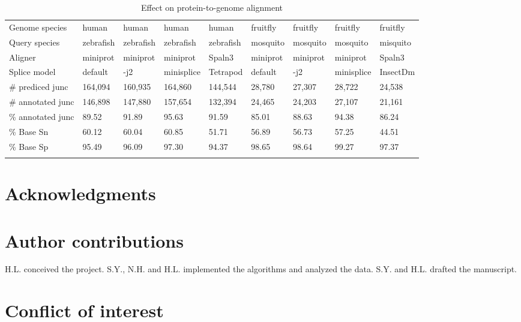 \documentclass[webpdf,contemporary,large,namedate]{oup-authoring-template}%
\begin{document}
\begin{table*}[!tb]
\caption{Effect on protein-to-genome alignment\label{tab:eval}}
\begin{tabular*}{\textwidth}{@{\extracolsep\fill}lllllllll@{\extracolsep\fill}}
\toprule
Genome species    & human     & human     & human      & human     & fruitfly & fruitfly & fruitfly   & fruitfly \\
Query species     & zebrafish & zebrafish & zebrafish  & zebrafish & mosquito & mosquito & mosquito   & misquito \\
Aligner           & miniprot  & miniprot  & miniprot   & Spaln3    & miniprot & miniprot & miniprot   & Spaln3 \\
Splice model      & default   & -j2       & minisplice & Tetrapod  & default  & -j2      & minisplice & InsectDm \\
\midrule
\# prediced junc  & 164,094   & 160,935   & 164,860    & 144,544   & 28,780   & 27,307   & 28,722     & 24,538 \\
\# annotated junc & 146,898   & 147,880   & 157,654    & 132,394   & 24,465   & 24,203   & 27,107     & 21,161 \\
\% annotated junc & 89.52     & 91.89     & 95.63      & 91.59     & 85.01    & 88.63    & 94.38      & 86.24 \\
\% Base Sn        & 60.12     & 60.04     & 60.85      & 51.71     & 56.89    & 56.73    & 57.25      & 44.51 \\
\% Base Sp        & 95.49     & 96.09     & 97.30      & 94.37     & 98.65    & 98.64    & 99.27      & 97.37 \\
\botrule
\end{tabular*}
\begin{tablenotes}\setlength\itemsep{0.0em}
\end{tablenotes}
\end{table*}
\section*{Acknowledgments}

\section*{Author contributions}

H.L. conceived the project.
S.Y., N.H. and H.L. implemented the algorithms and analyzed the data.
S.Y. and H.L. drafted the manuscript.

\section*{Conflict of interest}
\end{document}
